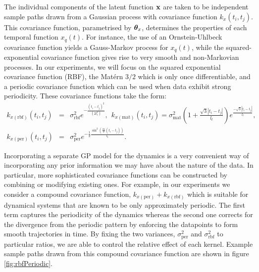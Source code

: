 \documentclass [10pt , a4paper]{article}
\begin{document}
\noindent The individual components of the latent function $\mathbf{x}$ are taken to be independent sample paths drawn from
a Gaussian process with covariance function $k_x(t_i,t_j)$. This covariance function, parametrised by $\boldsymbol \theta_x$,
determines the properties of each temporal function $x_q(t)$.
 For instance, the use of an Ornstein-Uhlbeck
covariance function yields a Gauss-Markov process for $x_q(t)$, while
the squared-exponential covariance function gives rise to very smooth and
non-Markovian processes. In our experiments, we will focus on the squared exponential
covariance function (RBF), the Mat\'ern $3/2$ which is only once
differentiable, and a periodic covariance function
\cite{rasmussen-williams, MacKay98} which can be used when data
exhibit strong periodicity. These covariance functions take the form:
\begin{eqnarray}
k_{x(\text{rbf})} \left( \mathit{t_i, t_j} \right) 
& = & \sigma_{\text{rbf}}^2 e^{- \frac{\left( t_i - t_j \right)^2}{\left(
      2l_t^2 \right)}}, 
\ \ k_{x(\text{mat})} \left( t_i, t_j \right) =  
\sigma_{\text{mat}}^2 \left( 1 + \frac{\sqrt{3} |t_i - t_j|}{l_t} \right)
		e^{\frac{ - \sqrt{3} |t_i - t_j|}{l_t} }, \nonumber \\
k_{x(\text{per})} \left( \mathit{t_i, t_j} \right) 
& = & 
	\sigma_{\text{per}}^2 e^{-\frac{1}{2} \frac{\sin^2 \left( \frac{2
                \pi}{T} \left( t_i - t_j \right) \right) }{l_t} }. 
 \label{eq:temporalkernels}
\end{eqnarray}


\par Incorporating a separate GP model for the dynamics is a very convenient way of incorporating any prior information
we may have about the nature of the data. In particular, more sophisticated covariance functions can be constructed
by combining or modifying existing ones. For example, in our experiments we consider a compound covariance function,
$k_{x(\text{per})} + k_{x(\text{rbf})}$
which is suitable for dynamical systems that are known to be only approximately periodic. The first term
captures the periodicity of the dynamics whereas the second one corrects for the divergence
from the periodic pattern by enforcing the datapoints to form smooth trajectories in time.
By fixing the two variances, $\sigma_{\text{per}}^2$ and $\sigma_{\text{rbf}}^2$ to particular ratios, we are able
to control the relative effect of each kernel. Example sample paths drawn from this compound covariance function are
shown in figure \ref{fig:rbfPeriodic}.
\end{document}
